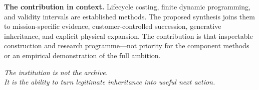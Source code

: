 \begin{center}
\end{center}

\textbf{The contribution in context.} Lifecycle costing, finite dynamic programming, and validity intervals are established methods. The proposed synthesis joins them to mission-specific evidence, customer-controlled succession, generative inheritance, and explicit physical expansion. The contribution is that inspectable construction and research programme---not priority for the component methods or an empirical demonstration of the full ambition.

\begin{center}\large\itshape
The institution is not the archive.\\[3pt]
It is the ability to turn legitimate inheritance into useful next action.
\end{center}
\clearpage
